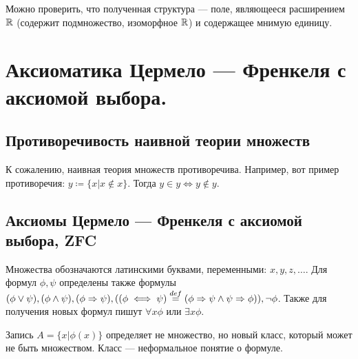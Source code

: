 \documentclass[a4paper]{report}
\begin{document}
    Можно проверить, что полученная структура --- поле, являющееся расширением $\mathbb{R}$ (содержит подмножество, изоморфное $\mathbb{R}$) и содержащее мнимую единицу.


    \chapter{Аксиоматика Цермело --- Френкеля с аксиомой выбора.}


    \section{Противоречивость наивной теории множеств}
    К сожалению, наивная теория множеств противоречива.
    Например, вот пример противоречия: $y \coloneqq \{x | x \notin x\}$.
    Тогда $y \in y \iff y \notin y$.


    \section{Аксиомы Цермело --- Френкеля с аксиомой выбора, ZFC}
    Множества обозначаются латинскими буквами, переменными: $x, y, z, \dots$.
    Для формул $\phi, \psi$ определены также формулы $(\phi \lor \psi), (\phi \land \psi), (\phi \Rightarrow \psi), ((\phi \iff \psi) \overset{def}{=} (\phi \Rightarrow \psi \land \psi \Rightarrow \phi)), \neg \phi$.
    Также для получения новых формул пишут $\forall x \phi$ или $\exists x \phi$.

    Запись $A = \{ x | \phi(x) \}$ определяет не множество, но новый класс, который может не быть множеством.
    Класс --- неформальное понятие о формуле.
\end{document}
